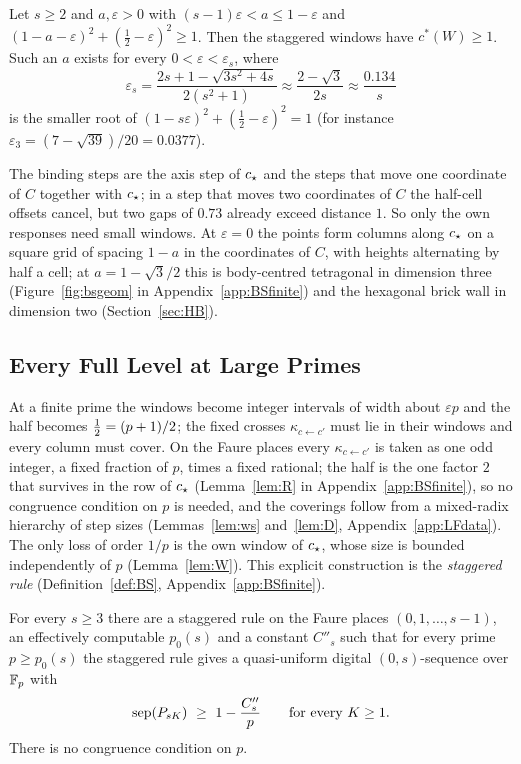 \begin{theorem}\label{thm:BS}
Let $s\ge2$ and $a,\varepsilon>0$ with $(s-1)\varepsilon<a\le1-\varepsilon$ and $(1-a-\varepsilon)^2+(\frac12-\varepsilon)^2\ge1$. Then the staggered windows have $c^*(W)\ge1$. Such an $a$ exists for every $0<\varepsilon<\varepsilon_s$, where
\[
\varepsilon_s=\frac{2s+1-\sqrt{3s^2+4s}}{2(s^2+1)}\approx\frac{2-\sqrt3}{2s}\approx\frac{0.134}s
\]
is the smaller root of $(1-s\varepsilon)^2+(\frac12-\varepsilon)^2=1$ (for instance $\varepsilon_3=(7-\sqrt{39})/20=0.0377$).
\end{theorem}
The binding steps are the axis step of $c_{\star}$ and the steps that move one coordinate of $C$ together with $c_{\star}$; in a step that moves two coordinates of $C$ the half-cell offsets cancel, but two gaps of $0.73$ already exceed distance $1$. So only the own responses need small windows. At $\varepsilon=0$ the points form columns along $c_{\star}$ on a square grid of spacing $1-a$ in the coordinates of $C$, with heights alternating by half a cell; at $a=1-\sqrt3/2$ this is body-centred tetragonal in dimension three (Figure~\ref{fig:bsgeom} in Appendix~\ref{app:BSfinite}) and the hexagonal brick wall in dimension two (Section~\ref{sec:HB}).

\subsection{Every Full Level at Large Primes}\label{sec:largep}
At a finite prime the windows become integer intervals of width about $\varepsilon p$ and the half becomes $\tfrac12=(p+1)/2$; the fixed crosses $\kappa_{c\leftarrow c'}$ must lie in their windows and every column must cover. On the Faure places every $\kappa_{c\leftarrow c'}$ is taken as one odd integer, a fixed fraction of $p$, times a fixed rational; the half is the one factor $2$ that survives in the row of $c_{\star}$ (Lemma~\ref{lem:R} in Appendix~\ref{app:BSfinite}), so no congruence condition on $p$ is needed, and the coverings follow from a mixed-radix hierarchy of step sizes (Lemmas~\ref{lem:ws} and~\ref{lem:D}, Appendix~\ref{app:LFdata}). The only loss of order $1/p$ is the own window of $c_{\star}$, whose size is bounded independently of $p$ (Lemma~\ref{lem:W}). This explicit construction is the \emph{staggered rule} (Definition~\ref{def:BS}, Appendix~\ref{app:BSfinite}).

\begin{theorem}\label{thm:A}
For every $s\ge3$ there are a staggered rule on the Faure places $(0,1,\dots,s-1)$, an effectively computable $p_0(s)$ and a constant $C''_s$ such that for every prime $p\ge p_0(s)$ the staggered rule gives a quasi-uniform digital $(0,s)$-sequence over $\mathbb{F}_p$ with
\[
\operatorname{sep}(P_{sK})\ \ge\ 1-\frac{C''_s}p\qquad\text{for every }K\ge1 .
\]
There is no congruence condition on $p$.
\end{theorem}

